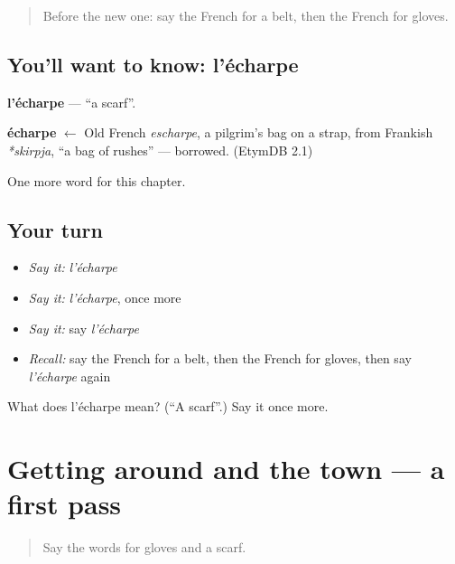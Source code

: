 \begin{quote}
Before the new one: say the French for a belt, then the French for gloves.
\end{quote}

\subsection*{You'll want to know: l'écharpe}
\textbf{l'écharpe} — \textquotedblleft{}a scarf\textquotedblright{}.

\begin{cousinweb}
\textbf{écharpe} $\leftarrow$ Old French \emph{escharpe}, a pilgrim's bag on a strap, from Frankish \emph{*skirpja}, \textquotedblleft{}a bag of rushes\textquotedblright{} — borrowed. (EtymDB 2.1)
\end{cousinweb}

\begin{grammarlens}[title={What you've built}]
One more word for this chapter.
\end{grammarlens}

\subsection*{Your turn}
\begin{itemize}
\raggedright
  \item \emph{Say it:} \emph{l'écharpe}
  \item \emph{Say it:} \emph{l'écharpe}, once more
  \item \emph{Say it:} say \emph{l'écharpe}
  \item \emph{Recall:} say the French for a belt, then the French for gloves, then say \emph{l'écharpe} again
\end{itemize}

\begin{tcolorbox}[breakable,colback=teal!4,colframe=teal!35!black,title={Before you move on}]
What does l'écharpe mean? (\textquotedblleft{}A scarf\textquotedblright{}.) Say it once more.
\end{tcolorbox}
\section[(dialogue)]{Getting around and the town — a first pass}

\label{lesson:FR-R116-first-pass-getting-around-and-the-town}



\begin{quote}
Say the words for gloves and a scarf.
\end{quote}

